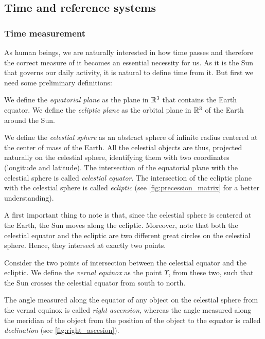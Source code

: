 \documentclass[../main.tex]{subfiles}
\begin{document}
\subsection{Time and reference systems}
\subsubsection{Time measurement}\label{sec:time_measurement}
As human beings, we are naturally interested in how time passes and therefore the correct measure of it becomes an essential necessity for us. As it is the Sun that governs our daily activity, it is natural to define time from it.
But first we need some preliminary definitions:
\begin{definition}
  We define the \emph{equatorial plane} as the plane in $\mathbb{R}^3$ that contains the Earth equator. We define the \emph{ecliptic plane} as the orbital plane in $\mathbb{R}^3$ of the Earth around the Sun.
\end{definition}
\begin{definition}
  We define the \emph{celestial sphere} as an abstract sphere of infinite radius centered at the center of mass of the Earth. All the celestial objects are thus, projected naturally on the celestial sphere, identifying them with two coordinates (longitude and latitude). The intersection of the equatorial plane with the celestial sphere is called \emph{celestial equator}. The intersection of the ecliptic plane with the celestial sphere is called \emph{ecliptic} (see \cref{fig:precession_matrix} for a better understanding).
\end{definition}
A first important thing to note is that, since the celestial sphere is centered at the Earth, the Sun moves along the ecliptic. Moreover, note that both the celestial equator and the ecliptic are two different great circles on the celestial sphere. Hence, they intersect at exactly two points.

\begin{definition}
  Consider the two points of intersection between the celestial equator and the ecliptic. We define the \emph{vernal equinox} as the point $\Upsilon$, from these two, such that the Sun crosses the celestial equator from south to north.
\end{definition}
The angle measured along the equator of any object on the celestial sphere from the vernal equinox is called \emph{right ascension}, whereas the angle measured along the meridian of the object from the position of the object to the equator is called \emph{declination} (see \cref{fig:right_ascesion}).
\end{document}
